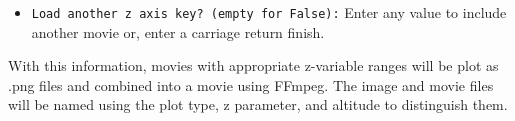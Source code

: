 \begin{itemize}
\begin{itemize}
    \item{{\tt Load another z axis key? (empty for False):} Enter any value to include another movie or, enter a carriage return finish.}
    \end{itemize}
\end{itemize}

With this information, movies with appropriate z-variable ranges will be plot as .png files and combined into a movie using FFmpeg.  The image and movie files will be named using the plot type, z parameter, and altitude to distinguish them.







